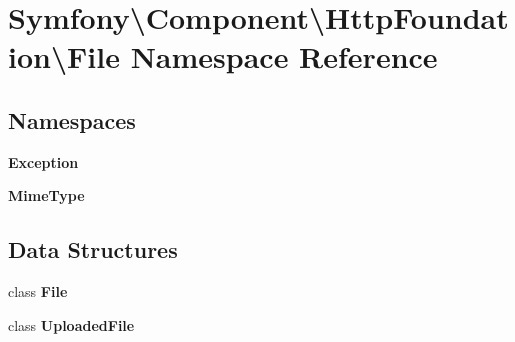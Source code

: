 \section{Symfony\textbackslash{}Component\textbackslash{}Http\+Foundation\textbackslash{}File Namespace Reference}
\label{namespace_symfony_1_1_component_1_1_http_foundation_1_1_file}
\subsection*{Namespaces}
\begin{DoxyCompactItemize}
\item 
 {\bf Exception}
\item 
 {\bf Mime\+Type}
\end{DoxyCompactItemize}
\subsection*{Data Structures}
\begin{DoxyCompactItemize}
\item 
class {\bf File}
\item 
class {\bf Uploaded\+File}
\end{DoxyCompactItemize}
